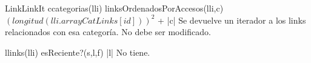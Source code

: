 \begin{interfaz}{LinkLinkIt}
{c\in categorias(lli)}
{\igres linksOrdenadosPorAccesos(lli,c)}
{$(longitud(lli.arrayCatLinks[id]))^2$ + |c|}
{Se devuelve un iterador a los links relacionados con esa categoría. No debe ser modificado.}

{l\in links(lli)}
{\igres esReciente?(s,l,f)}
{|l|}
{No tiene.}






\end{interfaz}